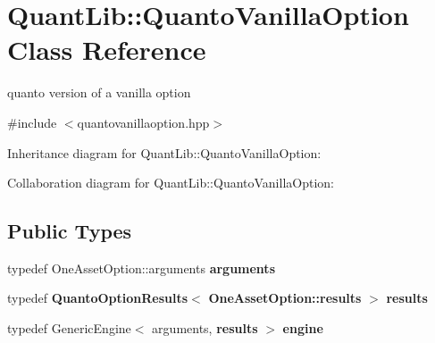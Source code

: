 \section{Quant\+Lib\+:\+:Quanto\+Vanilla\+Option Class Reference}
\label{class_quant_lib_1_1_quanto_vanilla_option}


quanto version of a vanilla option  




{\ttfamily \#include $<$quantovanillaoption.\+hpp$>$}



Inheritance diagram for Quant\+Lib\+:\+:Quanto\+Vanilla\+Option\+:


Collaboration diagram for Quant\+Lib\+:\+:Quanto\+Vanilla\+Option\+:
\subsection*{Public Types}
\begin{DoxyCompactItemize}
\item 
typedef One\+Asset\+Option\+::arguments {\bfseries arguments}\label{class_quant_lib_1_1_quanto_vanilla_option_a3aea7060e1a23d47d05b0f17cd117acf}

\item 
typedef {\bf Quanto\+Option\+Results}$<$ {\bf One\+Asset\+Option\+::results} $>$ {\bfseries results}\label{class_quant_lib_1_1_quanto_vanilla_option_a662dddd7e6a47a8ce5b1c43f691af3b0}

\item 
typedef Generic\+Engine$<$ arguments, {\bf results} $>$ {\bfseries engine}\label{class_quant_lib_1_1_quanto_vanilla_option_ac35fdceb3bc7205163506eeaa50f566a}

\end{DoxyCompactItemize}
